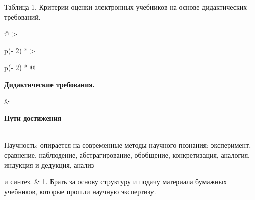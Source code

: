 \documentclass[
]{article}
\author{}
\date{}
\begin{document}
Таблица 1. Критерии оценки электронных учебников на основе дидактических
требований.

\begin{longtable}[]{@{}
  >{\raggedright\arraybackslash}p{(\columnwidth - 2\tabcolsep) * }
  >{\raggedright\arraybackslash}p{(\columnwidth - 2\tabcolsep) * }@{}}
\toprule
\begin{minipage}[b]{\linewidth}\raggedright
\textbf{Дидактические требования.}
\end{minipage} & \begin{minipage}[b]{\linewidth}\raggedright
\textbf{Пути достижения}
\end{minipage} \\
\midrule
\endhead
Научность: опирается на современные методы научного познания:
эксперимент, сравнение, наблюдение, абстрагирование, обобщение,
конкретизация, аналогия, индукция и дедукция, анализ

и синтез. & 1. Брать за основу структуру и подачу материала бумажных
учебников, которые прошли научную экспертизу.


\end{longtable}
\end{document}
